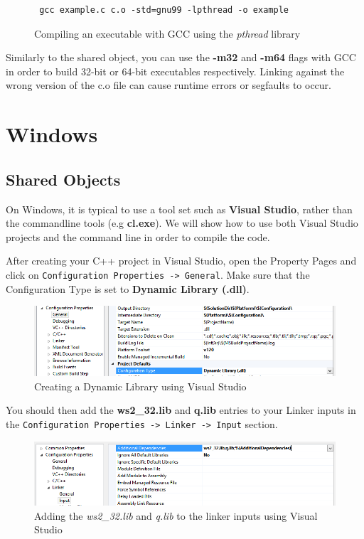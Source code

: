  \begin{figure}[h]
 \begin{lstlisting}
 gcc example.c c.o -std=gnu99 -lpthread -o example
 \end{lstlisting}
 \caption{Compiling an executable with GCC using the \textit{pthread} library}
 \end{figure}
 
 Similarly to the shared object, you can use the \textbf{-m32} and \textbf{-m64} flags with GCC in order to
 build 32-bit or 64-bit executables respectively. Linking against the wrong version of the c.o file can cause
 runtime errors or segfaults to occur. 
 
 \section{Windows}
 
 \subsection{Shared Objects}
 
 On Windows, it is typical to use a tool set such as \textbf{Visual Studio}, rather than the commandline tools (e.g \textbf{cl.exe}). We will show how to use both Visual Studio projects and the command line in order to compile the
 code.
 
 After creating your C++ project in Visual Studio, open the Property Pages and click on \verb|Configuration Properties -> General|. Make sure that the Configuration Type is set to \textbf{Dynamic Library (.dll)}.

  \begin{figure}[h]
  	\centering
  	\includegraphics[scale=0.50]{figures/vsdynamiclibrary.png}
  	\caption{Creating a Dynamic Library using Visual Studio}
  	\label{vsdynamiclibrary}
  \end{figure}

 You should then add the \textbf{ws2\_32.lib} and \textbf{q.lib} entries to your Linker inputs in the \verb|Configuration Properties -> Linker -> Input| section.  

	\begin{figure}[h]
		\centering
		\includegraphics[scale=0.50]{figures/vsdynamiclinker.png}
		\caption{Adding the \textit{ws2\_32.lib} and \textit{q.lib} to the linker inputs using Visual Studio}
		\label{vsdynamiclinker}
	\end{figure}
 
